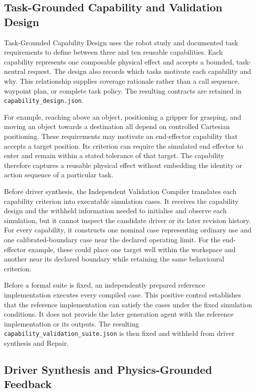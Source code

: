 \subsection{Task-Grounded Capability and Validation Design}

Task-Grounded Capability Design uses the robot study and documented task
requirements to define between three and ten reusable capabilities. Each
capability represents one composable physical effect and accepts a bounded,
task-neutral request. The design also records which tasks motivate each
capability and why. This relationship supplies coverage rationale rather than
a call sequence, waypoint plan, or complete task policy. The resulting
contracts are retained in \texttt{capability\_design.json}.

For example, reaching above an object, positioning a gripper for grasping, and
moving an object towards a destination all depend on controlled Cartesian
positioning. These requirements may motivate an end-effector capability that
accepts a target position. Its criterion can require the simulated end
effector to enter and remain within a stated tolerance of that target. The
capability therefore captures a reusable physical effect without embedding the
identity or action sequence of a particular task.

Before driver synthesis, the Independent Validation Compiler translates each
capability criterion into executable simulation cases. It receives the
capability design and the withheld information needed to initialise and
observe each simulation, but it cannot inspect the candidate driver or its
later revision history. For every capability, it constructs one nominal case
representing ordinary use and one calibrated-boundary case near the declared
operating limit. For the end-effector example, these could place one target
well within the workspace and another near its declared boundary while
retaining the same behavioural criterion.

Before a formal suite is fixed, an independently prepared reference
implementation executes every compiled case. This positive control establishes
that the reference implementation can satisfy the cases under the fixed
simulation conditions. It does not provide the later generation agent with the
reference implementation or its outputs. The resulting
\texttt{capability\_validation\_suite.json} is then fixed and withheld from
driver synthesis and Repair.

\subsection{Driver Synthesis and Physics-Grounded Feedback}

